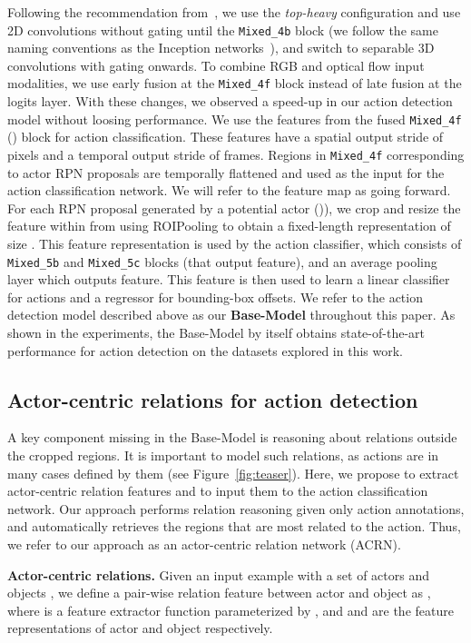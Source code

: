 \documentclass[runningheads]{llncs}
\newcommand{\mixed}[1]{\texttt{Mixed\_#1}}
\begin{document}
Following the recommendation from~\cite{s3dg_2017}, we use the \textit{top-heavy} configuration and use 2D convolutions without gating until the \mixed{4b} block (we follow the same naming conventions as the Inception networks~\cite{inception}), and switch to separable 3D convolutions with gating onwards. To combine RGB and optical flow input modalities, we use early fusion at the \mixed{4f} block instead of late fusion at the logits layer. With these changes, we observed a  speed-up in our action detection model without loosing performance. We use the features from the fused \mixed{4f} () block for action classification. These features have a spatial output stride of  pixels and a temporal output stride of  frames. Regions in \mixed{4f} corresponding to actor RPN proposals are temporally flattened and used as the input for the action classification network. We will refer to the  feature map as  going forward. For each RPN proposal generated by a potential actor ()), we crop and resize the feature within  from  using ROIPooling to obtain a fixed-length representation  of size . This feature representation is used by the action classifier, which consists of \mixed{5b} and \mixed{5c} blocks (that output  feature), and an average pooling layer which outputs  feature. This feature is then used to learn a linear classifier for actions and a regressor for bounding-box offsets. We refer to the action detection model described above as our \textbf{Base-Model} throughout this paper. As shown in the experiments, the Base-Model by itself obtains state-of-the-art performance for action detection on the datasets explored in this work.


\subsection{Actor-centric relations for action detection}
A key component missing in the Base-Model is reasoning about relations outside the cropped regions. It is important to model such relations, as actions are in many cases defined by them (see Figure~\ref{fig:teaser}). 
Here, we propose to extract actor-centric relation features and to input them to the action classification network. Our approach performs relation reasoning given only action annotations, and  automatically retrieves the regions that are most related to the action. Thus, we refer to our approach as an actor-centric relation network (ACRN).

\medskip\noindent\textbf{Actor-centric relations.} Given an input example  with a set of actors  and objects , we define a pair-wise relation feature between actor  and object  as 
, where  is a feature extractor function parameterized by , and  and  are the feature representations of actor  and object  respectively.
\end{document}
